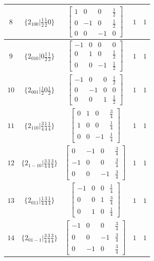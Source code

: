 \documentclass[fleqn,8pt]{jsarticle}
\begin{document}
\begin{longtable}{ccccc}
$ 8 $ & $ \{2{}_{100}|\frac{1}{2} \frac{1}{2} 0\} $ & $ \begin{bmatrix} 1 & 0 & 0 & \frac{1}{2} \\ 0 & -1 & 0 & \frac{1}{2} \\ 0 & 0 & -1 & 0 \end{bmatrix} $ & $ 1 $ & $ 1 $ \\ \hline
$ 9 $ & $ \{2{}_{010}|0 \frac{1}{2} \frac{1}{2}\} $ & $ \begin{bmatrix} -1 & 0 & 0 & 0 \\ 0 & 1 & 0 & \frac{1}{2} \\ 0 & 0 & -1 & \frac{1}{2} \end{bmatrix} $ & $ 1 $ & $ 1 $ \\ \hline
$ 10 $ & $ \{2{}_{001}|\frac{1}{2} 0 \frac{1}{2}\} $ & $ \begin{bmatrix} -1 & 0 & 0 & \frac{1}{2} \\ 0 & -1 & 0 & 0 \\ 0 & 0 & 1 & \frac{1}{2} \end{bmatrix} $ & $ 1 $ & $ 1 $ \\ \hline
$ 11 $ & $ \{2{}_{110}|\frac{3}{4} \frac{1}{4} \frac{1}{4}\} $ & $ \begin{bmatrix} 0 & 1 & 0 & \frac{3}{4} \\ 1 & 0 & 0 & \frac{1}{4} \\ 0 & 0 & -1 & \frac{1}{4} \end{bmatrix} $ & $ 1 $ & $ 1 $ \\ \hline
$ 12 $ & $ \{2{}_{1-10}|\frac{3}{4} \frac{3}{4} \frac{3}{4}\} $ & $ \begin{bmatrix} 0 & -1 & 0 & \frac{3}{4} \\ -1 & 0 & 0 & \frac{3}{4} \\ 0 & 0 & -1 & \frac{3}{4} \end{bmatrix} $ & $ 1 $ & $ 1 $ \\ \hline
$ 13 $ & $ \{2{}_{011}|\frac{1}{4} \frac{3}{4} \frac{1}{4}\} $ & $ \begin{bmatrix} -1 & 0 & 0 & \frac{1}{4} \\ 0 & 0 & 1 & \frac{3}{4} \\ 0 & 1 & 0 & \frac{1}{4} \end{bmatrix} $ & $ 1 $ & $ 1 $ \\ \hline
$ 14 $ & $ \{2{}_{01-1}|\frac{3}{4} \frac{3}{4} \frac{3}{4}\} $ & $ \begin{bmatrix} -1 & 0 & 0 & \frac{3}{4} \\ 0 & 0 & -1 & \frac{3}{4} \\ 0 & -1 & 0 & \frac{3}{4} \end{bmatrix} $ & $ 1 $ & $ 1 $ \\ \hline

\end{longtable}
\end{document}
